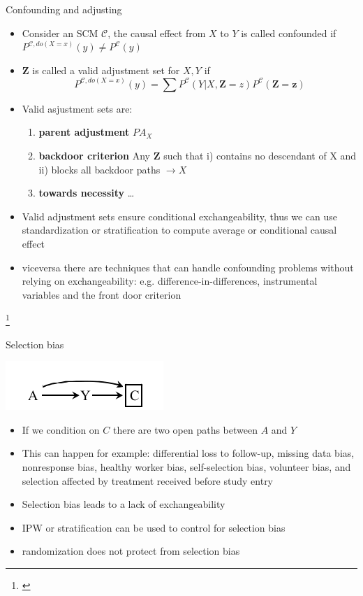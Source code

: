 \documentclass{beamer}
\newcommand\blfootnote[1]{%
  \begingroup
  \renewcommand\thefootnote{}\footnote{#1}%
  \addtocounter{footnote}{-1}%
  \endgroup
}
\begin{document}
\begin{frame}{Confounding and adjusting}
         \begin{itemize}
		 \item<1-> Consider an SCM $\mathcal{C}$, the causal effect from $X$ to $Y$ is called confounded if $P^{\mathcal{C}, do(X = x)}(y) \neq P^{\mathcal{C}}(y)$ 
		 \item<2-> $\mathbf{Z}$ is called a valid adjustment set for $X,Y$ if 
			 \[ P^{\mathcal{C}, do(X = x)}(y) = \sum P^{\mathcal{C}}(Y| X, \mathbf{Z} = z)P^{\mathcal{C}}(\mathbf{Z}=\mathbf{z}) \]
		 \item<3-> Valid asjustment sets are: 
			 \begin{enumerate}
				 \item \textbf{parent adjustment} $PA_X$ 
				 \item \textbf{backdoor criterion} Any $\mathbf{Z}$ such that i) contains no descendant of X and ii) blocks all backdoor paths $\rightarrow X$ 
				 \item \textbf{towards necessity}  \ldots 
			 \end{enumerate}
		 \item<4-> Valid adjustment sets ensure conditional exchangeability, thus we can use standardization or stratification to compute average or conditional causal effect 
		 \item<5-> viceversa there are techniques that can handle confounding problems without relying on exchangeability: e.g. difference-in-differences, instrumental variables and 
			 the front door criterion
	 \end{itemize}
	\blfootnote{\citet{peters2017elements}}
\end{frame}

\begin{frame}{Selection bias} 
	\begin{center}
\includegraphics[scale=1]{images/selection}
	\end{center}
	\begin{itemize}
		\item<1-> If we condition on $C$ there are two open paths between $A$ and $Y$ 
		\item<2-> This can happen for example: differential loss to follow-up, missing data bias, nonresponse bias, healthy worker bias, self-selection bias, volunteer bias, 
			and selection aﬀected by treatment received before study entry 
		\item<3-> Selection bias leads to a lack of exchangeability
		\item<4-> IPW or stratification can be used to control for selection bias 
		\item<5-> randomization does not protect from selection bias 
	\end{itemize}
\end{frame}
\end{document}
